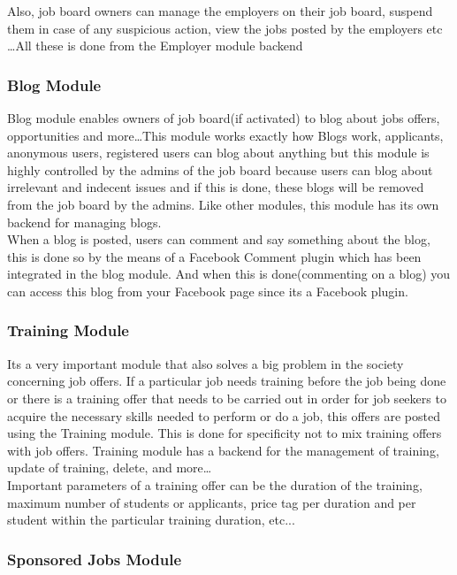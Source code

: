 Also, job board owners can manage the employers on their job board, suspend them in case of any suspicious action, view the jobs posted by the employers etc \ldots All these is done from the Employer module backend

\subsubsection{Blog Module}

Blog module enables owners of job board(if activated) to blog about jobs offers, opportunities and more\ldots This module works exactly how Blogs work, applicants, anonymous users, registered users can blog about anything but this module is highly controlled by the admins of the job board because users can blog about irrelevant and indecent issues and if this is done, these blogs will be removed from the job board by the admins. Like other modules, this module has its own backend for managing blogs. \\ 

When a blog is posted, users can comment and say something about the blog, this is done so by the means of a Facebook Comment plugin which has been integrated in the blog module. And when this is done(commenting on a blog) you can access this blog from your Facebook page since its a Facebook plugin.

\subsubsection{Training Module}

Its a very important module that also solves a big problem in the society concerning job offers. If a particular job needs training before the job being done or there is a training offer that needs to be carried out in order for job seekers to acquire the necessary skills needed to perform or do a job, this offers are posted using the Training module. This is done for specificity not to mix training offers with job offers. Training module has a backend for the management of training, update of training, delete, and more\ldots \\

Important parameters of a training offer can be the duration of the training, maximum number of students or applicants, price tag per duration and per student within the particular training duration, etc...

\subsubsection{Sponsored Jobs Module}

